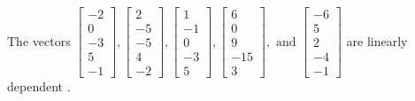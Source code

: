 \begin{exercise}
\begin{exerciseStatement}
  \end{exerciseStatement}
  \begin{exerciseAnswer}
   The vectors \(\left[\begin{array}{r}
-2 \\
0 \\
-3 \\
5 \\
-1
\end{array}\right] , \left[\begin{array}{r}
2 \\
-5 \\
-5 \\
4 \\
-2
\end{array}\right] , \left[\begin{array}{r}
1 \\
-1 \\
0 \\
-3 \\
5
\end{array}\right] , \left[\begin{array}{r}
6 \\
0 \\
9 \\
-15 \\
3
\end{array}\right] , \text{ and } \left[\begin{array}{r}
-6 \\
5 \\
2 \\
-4 \\
-1
\end{array}\right]\) are 
  	 linearly dependent  .
  


  \end{exerciseAnswer}
\end{exercise}